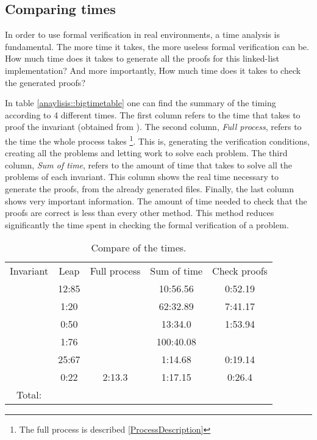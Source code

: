 \subsection{Comparing times}

In order to use formal verification in real environments, a time analysis is fundamental. 
%
The more time it takes, the more useless formal verification can be.
%
How much time does it takes to generate all the proofs for this linked-list implementation? 
%
And more importantly,  How much time does it takes to check the generated proofs? 

In table \ref{anaylisis::bigtimetable} one can find the summary of the timing according to 4 different times. The first column refers to the time that \leap takes to proof the invariant (obtained from \cite{paperParametrizedInvariants}). 
%
The second column, \textit{Full process}, refers to the time the whole process takes \footnote{The full process is described  \ref{ProcessDescription}}. 
%
This is, generating the verification conditions, creating all the \spass problems and letting \spass work to solve each problem.
%
The third column, \textit{Sum of \spass time}, refers to the amount of time that \spass takes to solve all the problems of each invariant.
%
This column shows the real time necessary to generate the proofs, from the already generated files.
%
Finally, the last column shows very important information.
%
The amount of time needed to check that the proofs are correct is less than every other method. 
%
This method reduces significantly the time spent in checking the formal verification of a problem.


\begin{table}[hbtp]
\centering
\begin{tabular}{c|cccc}
Invariant 		& Leap 	& Full process 		& Sum of \spass time 	& Check proofs 	\\
\invPreserve 	& 12:85	&					& 10:56.56				& 0:52.19		\\
\invOrder		& 1:20	&					& 62:32.89				& 7:41.17 		\\
\invLock		& 0:50	& 					& 13:34.0  				& 1:53.94		\\
\invNext 		& 1:76	&					& 100:40.08				& 		\\
\invRegion		& 25:67	& 					& 1:14.68				& 0:19.14		\\
\invDisjoint 	& 0:22 	& 2:13.3 			& 1:17.15 				& 0:26.4		\\
Total: 			& 		& 					& 						&  				\\
\end{tabular}
\caption{Compare of the times.}
\label{anaylsis:bigtimetable}
\end{table}


